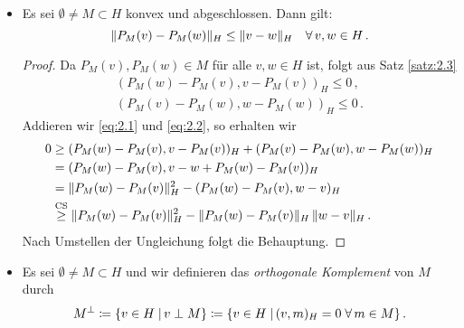 \begin{itemize}
\begin{proof}
 Es sei o.B.d.A. $0\in M$ und $m_0=0$.
 
  "`$\Rightarrow$"' Wegen $0=P_M(x)$ muss $\norm{v-tm}_H\geq\norm v_H$ für $m\in M$ und $0\leq t\leq1$ sein. Dann ist
\begin{align*}
    	 \norm v^2_H\leq\norm v^2_H-2t(v, m)_H+t^2\norm m^2_H
	\ \lra \ 0 \le - 2t (v,m)_H + \underbrace{t^2 \norm m_H^2}_{\ge 0} \, .
 \end{align*}
Damit ist $2(v, m)_H\leq0$.
 
 "`$\La$"' Für alle $m\in M$ ist $(v, m)_H\leq0$. Es folgt
\[ 
	\norm v^2_H\leq\norm v^2_H+\norm m^2-2(v,m)_H=\norm{v-m}^2_H\, . 
\]
Wegen $0\in M$ ist $\dist(v,M)=\norm v^2_H$ und damit $0=P_M(v)$.
\end{proof}

\item \begin{satz}\label{satz:2.4}
Es sei $\emptyset \not = M \subset H$ konvex und abgeschlossen. Dann gilt:
\[
	\lVert P_M(v)-P_M(w)\rVert_H \le \lVert v-w\rVert_H \quad \forall \, v,w \in H \, .
\]
\end{satz}

\begin{proof}
Da $P_M(v), P_M(w) \in M$ für alle $v,w \in H$ ist, folgt aus Satz \ref{satz:2.3}
\begin{align}\label{eq:2.1}
	(P_M(w)-P_M(v),v-P_M(v))_H  \le 0 \, , \\
	(P_M(v)-P_M(w),w-P_M(w))_H \le 0 \, .\label{eq:2.2}
\end{align}
Addieren wir \eqref{eq:2.1} und \eqref{eq:2.2}, so erhalten wir
\begin{align*}
	0 &\ge (P_M(w)-P_M(v),v-P_M(v))_H + (P_M(v)-P_M(w),w-P_M(w))_H \\
	& = (P_M(w)-P_M(v),v-w+P_M(w)-P_M(v))_H \\
	& = \lVert P_M(w)-P_M(v)\rVert_H^2-(P_M(w)-P_M(v),w-v)_H \\
	&\stackrel{\scriptsize \text{CS}}\ge \lVert P_M(w)-P_M(v)\rVert_H^2 - \lVert P_M(w)-P_M(v)\rVert_H \, \lVert w-v\rVert_H \, .
\end{align*}
Nach Umstellen der Ungleichung folgt die Behauptung.
\end{proof}

\item \begin{defi}
Es sei $\emptyset\neq M\subset H$ und wir definieren das \textit{{orthogonale Komplement}} von $M$ durch
\[
	M^\perp\coloneqq\{v\in H\;\vert\, v\perp M\}\coloneqq\{v\in H\;\vert\, (v, m)_H=0\;\forall\,  m\in M\}\, .
\]
\end{defi}


\end{itemize}
